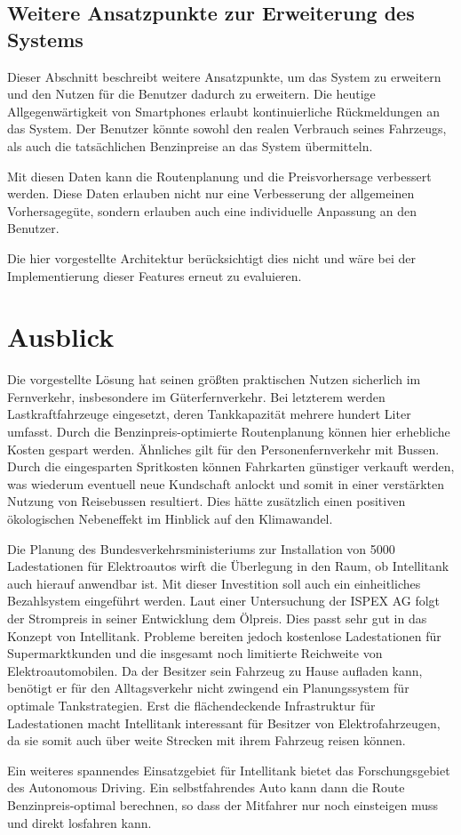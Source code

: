 \documentclass[
ngerman          %
,a4paper          %
,11pt
,pdftex
]{report}
\begin{document}
\section{Weitere Ansatzpunkte zur Erweiterung des Systems}
\label{sec:org85ddd52}

Dieser Abschnitt beschreibt weitere Ansatzpunkte, um das System zu erweitern und den Nutzen für die Benutzer dadurch zu erweitern. Die heutige Allgegenwärtigkeit von Smartphones erlaubt kontinuierliche Rückmeldungen an das System. Der Benutzer könnte sowohl den realen Verbrauch seines Fahrzeugs, als auch die tatsächlichen Benzinpreise an das System übermitteln.

Mit diesen Daten kann die Routenplanung und die Preisvorhersage verbessert werden. Diese Daten erlauben nicht nur eine Verbesserung der allgemeinen Vorhersagegüte, sondern erlauben auch eine individuelle Anpassung an den Benutzer. 

Die hier vorgestellte Architektur berücksichtigt dies nicht und wäre bei der Implementierung dieser Features erneut zu evaluieren.

\chapter{Ausblick}
Die vorgestellte Lösung hat seinen größten praktischen Nutzen sicherlich im Fernverkehr, insbesondere im Güterfernverkehr. Bei letzterem werden Lastkraftfahrzeuge eingesetzt, deren Tankkapazität mehrere hundert Liter umfasst. Durch die Benzinpreis-optimierte Routenplanung können hier erhebliche Kosten gespart werden. Ähnliches gilt für den Personenfernverkehr mit Bussen. Durch die eingesparten Spritkosten können Fahrkarten günstiger verkauft werden, was wiederum eventuell neue Kundschaft anlockt und somit in einer verstärkten Nutzung von Reisebussen resultiert. Dies hätte zusätzlich einen positiven ökologischen Nebeneffekt im Hinblick auf den Klimawandel. \\
\par
Die Planung des Bundesverkehrsministeriums zur Installation von 5000 Ladestationen für Elektroautos \cite{ladestations-planung} wirft die Überlegung in den Raum, ob Intellitank auch hierauf anwendbar ist. Mit dieser Investition soll auch ein einheitliches Bezahlsystem eingeführt werden. Laut einer Untersuchung der ISPEX AG \cite{oel-strom} folgt der Strompreis in seiner Entwicklung dem Ölpreis. Dies passt sehr gut in das Konzept von Intellitank. Probleme bereiten jedoch kostenlose Ladestationen für Supermarktkunden und die insgesamt noch limitierte Reichweite von Elektroautomobilen. Da der Besitzer sein Fahrzeug zu Hause aufladen kann, benötigt er für den Alltagsverkehr nicht zwingend ein Planungssystem für optimale Tankstrategien. Erst die flächendeckende Infrastruktur für Ladestationen macht Intellitank interessant für Besitzer von Elektrofahrzeugen, da sie somit auch über weite Strecken mit ihrem Fahrzeug reisen können. \\
\par 
Ein weiteres spannendes Einsatzgebiet für Intellitank bietet das Forschungsgebiet des Autonomous Driving. Ein selbstfahrendes Auto kann dann die Route Benzinpreis-optimal berechnen, so dass der Mitfahrer nur noch einsteigen muss und direkt losfahren kann. 
\end{document}
